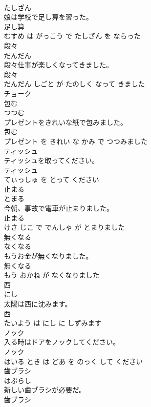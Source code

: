 \documentclass[8pt]{extreport}
\begin{document}
\begin{CJK}{UTF8}{min}
\\	たしざん			
\\	娘は学校で足し算を習った。	
\\	足し算 
\\	むすめ は がっこう で たしざん を ならった			
\\	段々	
\\	だんだん			
\\	段々仕事が楽しくなってきました。	
\\	段々 
\\	だんだん しごと が たのしく なって きました			
\\	チョーク	
\\	包む	
\\	つつむ			
\\	プレゼントをきれいな紙で包みました。	
\\	包む 
\\	プレゼント を きれい な かみ で つつみました			
\\	ティッシュ	
\\	ティッシュを取ってください。	
\\	ティッシュ 
\\	てぃっしゅ を とって ください			
\\	止まる	
\\	とまる			
\\	今朝、事故で電車が止まりました。	
\\	止まる 
\\	けさ じこ で でんしゃ が とまりました			
\\	無くなる	
\\	なくなる			
\\	もうお金が無くなりました。	
\\	無くなる 
\\	もう おかね が なくなりました			
\\	西	
\\	にし			
\\	太陽は西に沈みます。	
\\	西 
\\	たいよう は にし に しずみます			
\\	ノック	
\\	入る時はドアをノックしてください。	
\\	ノック 
\\	はいる とき は どあ を のっく して ください			
\\	歯ブラシ	
\\	はぶらし			
\\	新しい歯ブラシが必要だ。	
\\	歯ブラシ 

\end{CJK}
\end{document}
